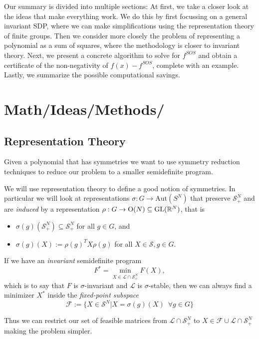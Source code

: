 \documentclass[]{article}
\begin{document}
Our summary is divided into multiple sections: 
At first, we take a closer look at the ideas that make everything work. We do this by first focussing on a general invariant SDP, where we can make simplifications using the representation theory of finite groups. Then we consider more closely the problem of representing a polynomial as a sum of squares, where the methodology is closer to invariant theory.
Next, we present a concrete algorithm to solve for $f^{SOS}$ and obtain a certificate of the non-negativity of $f(x)-f^{SOS}$, complete with an example. Lastly, we summarize the possible computational savings.\\%

\section{Math/Ideas/Methods/}
\subsection*{Representation Theory}

Given a polynomial that has symmetries we want to use symmetry reduction techniques to reduce our problem to a smaller semidefinite program.

We will use representation theory to define a good notion of symmetries. In particular we will look at representations
$\sigma:G\rightarrow \mathrm{Aut}(S^N)$ that preserve $\mathcal{S}_+^N$ and are \textit{induced} by a representation $\rho:G\rightarrow \mathrm{O}(N)\subseteq\mathrm{GL}(\mathbb R^N)$, 
that is 
\begin{itemize}
    \item $\sigma(g)(\mathcal{S}_+^N)\subseteq \mathcal{S}_+^N$ for all $g\in G$, and
    \item $\sigma(g)(X) := \rho(g)^TX\rho(g)$ for all $X\in \mathcal{S} , g\in G.$
\end{itemize}

If we have an \textit{invariant} semidefinite program 
\[
    F^\ast=\min_{X\in\mathcal{L}\cap\mathcal{S}_+^N}F(X),
\]
which is to say that $F$ is $\sigma$-invariant and $\mathcal{L}$ is $\sigma$-stable, then we can always find a minimizer $X^\ast$ inside the \textit{fixed-point subspace} 
\[
    \mathcal{F} := \{X\in\mathcal{S}^N | X= \sigma(g)(X)\,\,\, \forall g \in G\}
\]

Thus we can restrict our set of feasible matrices from $\mathcal{L}\cap \mathcal{S}_+^N$ to $ X\in\mathcal{F}\cup\mathcal{L}\cap \mathcal{S}_+^N$ making the problem simpler.
\end{document}
